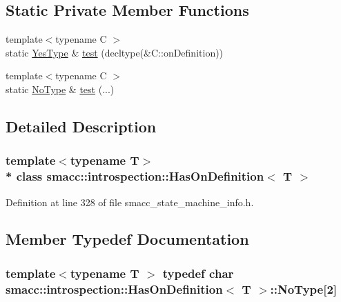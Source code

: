 \subsection*{Static Private Member Functions}
\begin{DoxyCompactItemize}
\item 
{\footnotesize template$<$typename C $>$ }\\static \hyperlink{classsmacc_1_1introspection_1_1HasOnDefinition_ad18cda8f47c5a0e9660b7c7ca54d98c7}{Yes\+Type} \& \hyperlink{classsmacc_1_1introspection_1_1HasOnDefinition_a67765fe6ab28cd7062f75b6456d760e5}{test} (decltype(\&C\+::on\+Definition))
\item 
{\footnotesize template$<$typename C $>$ }\\static \hyperlink{classsmacc_1_1introspection_1_1HasOnDefinition_ab6416d52a925d6a0ce9204897191692e}{No\+Type} \& \hyperlink{classsmacc_1_1introspection_1_1HasOnDefinition_a22cbbab4a5ce8f1b85cfd98a374f7f49}{test} (...)
\end{DoxyCompactItemize}


\subsection{Detailed Description}
\subsubsection*{template$<$typename T$>$\\*
class smacc\+::introspection\+::\+Has\+On\+Definition$<$ T $>$}



Definition at line 328 of file smacc\+\_\+state\+\_\+machine\+\_\+info.\+h.



\subsection{Member Typedef Documentation}
\subsubsection[{\texorpdfstring{No\+Type}{NoType}}]{\setlength{\rightskip}{0pt plus 5cm}template$<$typename T $>$ typedef char {\bf smacc\+::introspection\+::\+Has\+On\+Definition}$<$ T $>$\+::No\+Type\mbox{[}2\mbox{]}\hspace{0.3cm}{\ttfamily [private]}}\hypertarget{classsmacc_1_1introspection_1_1HasOnDefinition_ab6416d52a925d6a0ce9204897191692e}{}\label{classsmacc_1_1introspection_1_1HasOnDefinition_ab6416d52a925d6a0ce9204897191692e}


